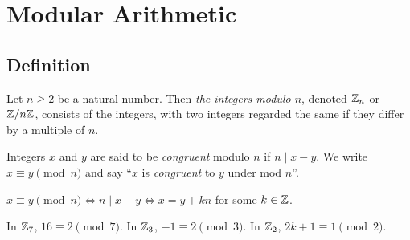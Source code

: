 \documentclass[../main.tex]{subfiles}
\begin{document}
\chapter{Modular Arithmetic}
\section{Definition}
\begin{definition}
Let $n \geq 2$ be a natural number.
Then \textit{the integers modulo $n$}, denoted $\mathbb{Z}_n$ or $\mathbb{Z}/n\mathbb{Z}$, consists of the integers, with two integers regarded the same if they differ by a multiple of $n$.
\end{definition}
\begin{definition}[Congruent]
  Integers $x$ and $y$ are said to be \textit{congruent} modulo $n$ if $n \mid x - y$.
  We write $x \equiv y \pmod{n}$ and say ``$x$ is \textit{congruent} to $y$ under mod $n$''.
\end{definition}
\begin{remark}[Note]
  $x \equiv y \pmod{n} \iff n \mid x - y \iff x = y + kn$ for some $k \in \mathbb{Z}$.
\end{remark}
\begin{example}
  In $\mathbb{Z}_7$, $16 \equiv 2 \pmod{7}$.
  In $\mathbb{Z}_3$, $-1 \equiv 2 \pmod{3}$.
  In $\mathbb{Z}_2$, $2k + 1 \equiv 1 \pmod{2}$.
\end{example}
\end{document}
